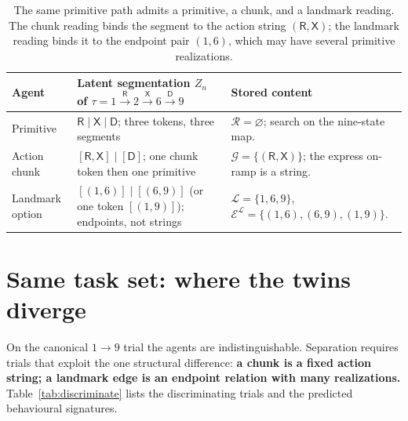 \documentclass[11pt]{article}
\begin{document}
\begin{table}[htbp]
\centering\small
\begin{tabularx}{\textwidth}{lYY}
\toprule
Agent & Latent segmentation $Z_n$ of $\tau=1\xrightarrow{\mathsf R}2\xrightarrow{\mathsf X}6\xrightarrow{\mathsf D}9$ & Stored content \\
\midrule
Primitive &
$\mathsf R\mid\mathsf X\mid\mathsf D$; three tokens, three segments &
$\mathcal R=\varnothing$; search on the nine-state map. \\
Action chunk &
$[\mathsf R,\mathsf X]\mid[\mathsf D]$; one chunk token then one primitive &
$\mathcal G=\{(\mathsf R,\mathsf X)\}$; the express on-ramp is a string. \\
Landmark option &
$[(1,6)]\mid[(6,9)]$ (or one token $[(1,9)]$); endpoints, not strings &
$\mathcal L=\{1,6,9\}$, $\mathcal E^{\mathcal L}=\{(1,6),(6,9),(1,9)\}$. \\
\bottomrule
\end{tabularx}
\caption{The same primitive path admits a primitive, a chunk, and a landmark reading. The
chunk reading binds the segment to the action string $(\mathsf R,\mathsf X)$; the landmark
reading binds it to the endpoint pair $(1,6)$, which may have several primitive
realizations.}
\label{tab:explain}
\end{table}

\section{Same task set: where the twins diverge}

On the canonical $1\to9$ trial the agents are indistinguishable. Separation requires trials
that exploit the one structural difference: \textbf{a chunk is a fixed action string; a
landmark edge is an endpoint relation with many realizations.} Table~\ref{tab:discriminate}
lists the discriminating trials and the predicted behavioural signatures.
\end{document}
